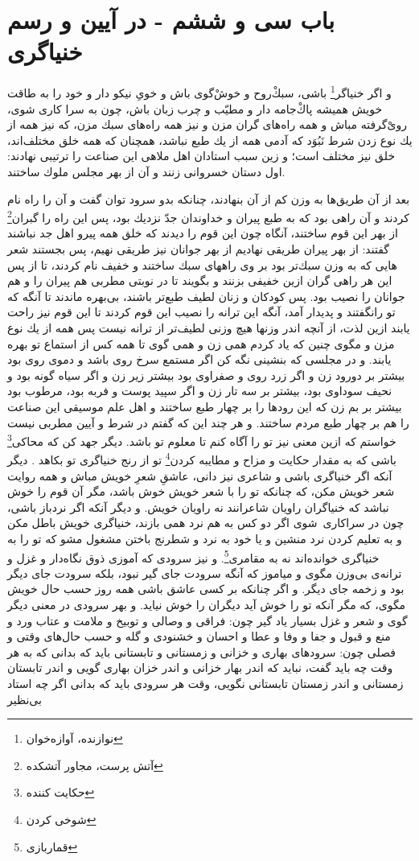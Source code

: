 \section*{باب سى و ششم - 
در آيين و رسم خنياگرى}

و اگر خنياگر\footnote{نوازنده، آوازه‌خوان} باشى، سبكْ‌روح و خوش‌ْگوى باش و خوىِ نيكو دار و خود را به طاقت خويش هميشه پاك‌ْجامه دار و مطيّب و چرب زبان باش، چون به سرا كارى شوى، رویْ‌گرفته مباش و همه راه‌هاى گران مزن و نيز همه راه‌هاى سبك مزن، كه نيز همه از يك نوع زدن شرط نَبُوَد كه آدمى همه از يك طبع نباشد، همچنان كه همه خلق مختلف‌اند، خلق نيز مختلف است؛ و زين سبب استادان اهل ملاهى اين صناعت را ترتيبى نهادند: اول دستان خسروانى زنند و آن از بهر مجلس ملوك ساختند.

بعد از آن طريق‌ها به وزن كم از آن بنهادند، چنانكه بدو سرود توان گفت و آن را راه نام كردند و آن راهى بود كه به طبع پيران و خداوندان جدّ نزديك بود، پس اين راه را گبران\footnote{آتش پرست، مجاور آتشکده} از بهر اين قوم ساختند، آنگاه چون اين قوم را ديدند كه خلق همه پيرو اهل جد نباشند گفتند: از بهر پيران طريقى نهاديم از بهر جوانان نيز طريقى نهيم، پس بجستند شعر هايى كه به وزن سبك‌تر بود بر وى راههاى سبك ساختند و خفيف نام كردند، تا از پس اين هر راهى گران ازين خفيفى بزنند و بگويند تا در نوبتى مطربى هم پيران را و هم جوانان را نصيب بود. پس كودكان و زنان لطيف‌ طبع‌تر باشند، بى‌بهره ماندند تا آنگه كه تو رانگفتند و پديدار آمد، آنگه اين ترانه را نصيب اين قوم كردند تا اين قوم نيز راحت يابند ازين لذت، از آنچه اندر وزنها هيچ وزنى لطيف‌تر از ترانه نيست پس همه از يك نوع مزن و مگوى چنين كه ياد كردم همى زن و همى گوى تا همه كس از استماع تو بهره يابند. و در مجلسى كه بنشينى نگه كن اگر مستمع سرخ روى باشد و دموى روى بود بيشتر بر دورود زن و اگر زرد روى و صفراوى بود بيشتر زير زن و اگر سياه گونه بود و نحيف سوداوى بود، بيشتر بر سه تار زن و اگر سپيد پوست و فربه بود، مرطوب بود بيشتر بر بم زن كه اين رودها را بر چهار طبع ساختند و اهل علم موسيقى اين صناعت را هم بر چهار طبع مردم ساختند. و هر چند اين كه گفتم در شرط و آيين مطربى نيست خواستم كه ازين معنى نيز تو را آگاه كنم تا معلوم تو باشد. ديگر جهد كن كه محاكى\footnote{حکایت کننده} باشى كه به مقدار حكايت و مزاح و مطايبه كردن\footnote{شوخی کردن} تو از رنج خنياگرى تو بكاهد . ديگر آنكه اگر خنياگرى باشى و شاعرى نيز دانى، عاشقِ شعرِ خويش مباش و همه روايت شعر خويش مكن، كه چنانكه تو را با شعر خويش خوش باشد، مگر آن قوم را خوش نباشد كه خنياگران راويان شاعرانند نه راويان خويش. و ديگر آنكه اگر نردباز باشى، چون در سراكارى\ شوى اگر دو كس به هم نرد همى بازند، خنياگرى خويش باطل مكن و به تعليم كردن نرد منشين و يا خود به نرد و شطرنج باختن مشغول مشو كه تو را به خنياگرى خوانده‌اند نه به مقامرى\footnote{قماربازی}. و نيز سرودى كه آموزى ذوق نگاه‌دار و غزل و ترانه‌ی بى‌وزن مگوى و مياموز كه آنگه سرودت جاى گير نبود، بلكه سرودت جاى ديگر بود و زخمه جاى ديگر. و اگر چنانكه بر كسى عاشق باشى همه روز حسب حال خويش مگوى، كه مگر آنكه تو را خوش آيد ديگران را خوش نیايد. و بهر سرودى در معنى ديگر گوى و شعر و غزل بسيار ياد گير چون: فراقى و وصالى و توبيخ و ملامت و عتاب ورد و منع و قبول و جفا و وفا و عطا و احسان و خشنودى و گله و حسب حال‌هاى وقتى و فصلى چون: سرودهاى بهارى و خزانى و زمستانى و تابستانى بايد كه بدانى كه به هر وقت چه بايد گفت، نبايد كه اندر بهار خزانى و اندر خزان بهارى گويى و اندر تابستان زمستانى و اندر زمستان تابستانى نگويى، وقت هر سرودى بايد كه بدانى اگر چه استاد بى‌نظير 